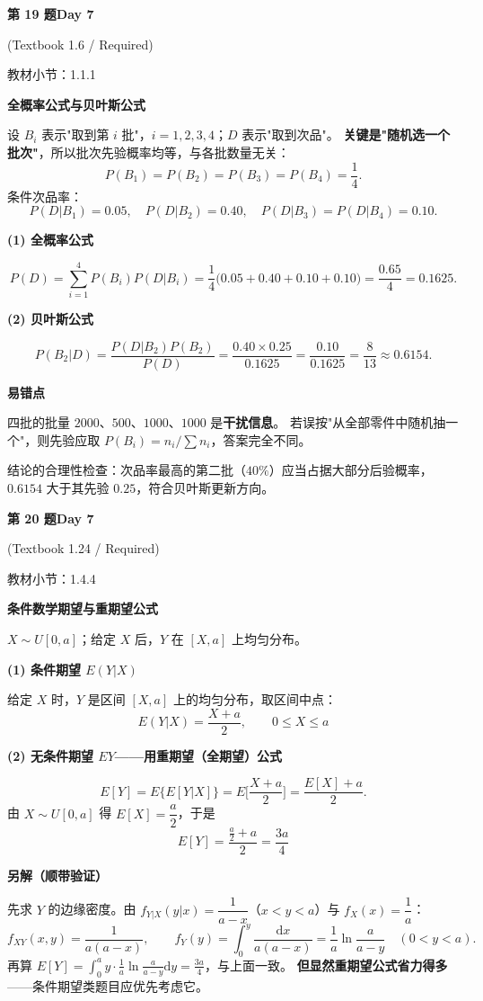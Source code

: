 \documentclass[10.5pt,fontset=fandol]{ctexart}
\newcommand{\key}[1]{\par\vspace{4pt}\noindent\textbf{\color{navy}#1}\par\vspace{2pt}}
\newcommand{\dd}{\mathrm d}\newcommand{\Var}{\operatorname{Var}}\newcommand{\Cov}{\operatorname{Cov}}
\newcommand{\qtitle}[2]{\par\addvspace{1.2em}\Needspace{8\baselineskip}\begin{tcolorbox}[colback=navy,colframe=navy,arc=1.5pt,boxrule=0pt]\color{white}\large\bfseries #1\hfill\small #2\end{tcolorbox}}
\begin{document}
\qtitle{第 19 题}{Day 7}
{\small\color{accentred}(Textbook 1.6 / Required)}\par\smallskip
{\small\color{muted}教材小节：1.1.1}\par\medskip
\noindent\textbf{全概率公式与贝叶斯公式}\par\smallskip\begin{tcolorbox}[breakable,colback=qbg,colframe=qbg,boxrule=0pt]设 $B_i$ 表示"取到第 $i$ 批"，$i=1,2,3,4$；$D$ 表示"取到次品"。
\textbf{关键是"随机选一个批次"}，所以批次先验概率均等，与各批数量无关：
\[
P(B_1)=P(B_2)=P(B_3)=P(B_4)=\frac14 .
\]
条件次品率：
\[
P(D|B_1)=0.05,\quad P(D|B_2)=0.40,\quad P(D|B_3)=P(D|B_4)=0.10 .
\]

\key{(1) 全概率公式}
\[
P(D)=\sum_{i=1}^{4}P(B_i)P(D|B_i)
=\frac14\big(0.05+0.40+0.10+0.10\big)=\frac{0.65}{4}=0.1625 .
\]

\key{(2) 贝叶斯公式}
\[
P(B_2|D)=\frac{P(D|B_2)P(B_2)}{P(D)}
=\frac{0.40\times0.25}{0.1625}=\frac{0.10}{0.1625}=\frac{8}{13}\approx0.6154 .
\]

\key{易错点}
\begin{bul}
  \item 四批的批量 $2000$、$500$、$1000$、$1000$ 是\textbf{干扰信息}。
        若误按"从全部零件中随机抽一个"，则先验应取 $P(B_i)=n_i/\sum n_i$，答案完全不同。
  \item 结论的合理性检查：次品率最高的第二批（$40\%$）应当占据大部分后验概率，
        $0.6154$ 大于其先验 $0.25$，符合贝叶斯更新方向。
\end{bul}
\end{tcolorbox}
\qtitle{第 20 题}{Day 7}
{\small\color{accentred}(Textbook 1.24 / Required)}\par\smallskip
{\small\color{muted}教材小节：1.4.4}\par\medskip
\noindent\textbf{条件数学期望与重期望公式}\par\smallskip\begin{tcolorbox}[breakable,colback=qbg,colframe=qbg,boxrule=0pt]$X\sim U[0,a]$；给定 $X$ 后，$Y$ 在 $[X,a]$ 上均匀分布。

\key{(1) 条件期望 $E(Y|X)$}
给定 $X$ 时，$Y$ 是区间 $[X,a]$ 上的均匀分布，取区间中点：
\[
\boxed{\,E(Y|X)=\frac{X+a}{2},\qquad 0\le X\le a\,}
\]

\key{(2) 无条件期望 $EY$——用重期望（全期望）公式}
\[
E[Y]=E\big\{E[Y|X]\big\}=E\Big[\frac{X+a}{2}\Big]=\frac{E[X]+a}{2}.
\]
由 $X\sim U[0,a]$ 得 $E[X]=\dfrac a2$，于是
\[
\boxed{\,E[Y]=\frac{\frac a2+a}{2}=\frac{3a}{4}\,}
\]

\key{另解（顺带验证）}
先求 $Y$ 的边缘密度。由 $f_{Y|X}(y|x)=\dfrac{1}{a-x}$（$x<y<a$）与 $f_X(x)=\dfrac1a$：
\[
f_{XY}(x,y)=\frac{1}{a(a-x)},\qquad
f_Y(y)=\int_0^y\frac{\dd x}{a(a-x)}=\frac1a\ln\frac{a}{a-y}\quad(0<y<a).
\]
再算 $E[Y]=\displaystyle\int_0^a y\cdot\frac1a\ln\frac{a}{a-y}\dd y=\frac{3a}{4}$，与上面一致。
\textbf{但显然重期望公式省力得多}——条件期望类题目应优先考虑它。
\end{tcolorbox}
\end{document}
